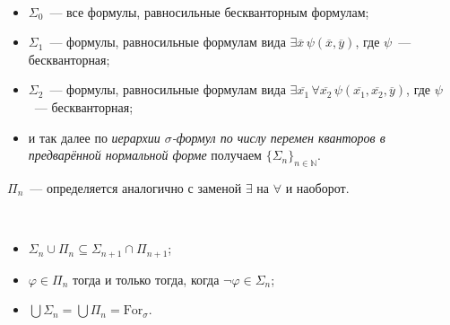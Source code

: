 
\begin{definition}\
    \begin{itemize}
        \item $\Sigma_0$~— все формулы, равносильные бескванторным формулам; 
        \item $\Sigma_1$~— формулы, равносильные формулам вида $\exists \overline{x}\, \psi(\overline{x}, \overline{y})$, где $\psi$~— бескванторная; 
        \item $\Sigma_2$~— формулы, равносильные формулам вида $\exists \overline{x_1}\, \forall \overline{x_2}\, \psi(\overline{x_1}, \overline{x_2}, \overline{y})$, где $\psi$~— бескванторная;
        \item и так далее по \textit{иерархии $\sigma$-формул по числу перемен кванторов в предварённой нормальной форме} получаем $\{\Sigma_n\}_{n \in \mathbb{N}}$.
    \end{itemize}

    $\Pi_n$~—  определяется аналогично с заменой $\exists$ на $\forall$ и наоборот.
\end{definition}


\begin{prop} \ 

    \begin{itemize}
        \item $\Sigma_n \cup \Pi_n \subseteq \Sigma_{n+1} \cap \Pi_{n+1}$; 
        \item $\varphi \in \Pi_n$ тогда и только тогда, когда $\neg \varphi \in \Sigma_n$; 
        \item $\bigcup \Sigma_n = \bigcup \Pi_n = \text{For}_\sigma$.
    \end{itemize}
\end{prop}

